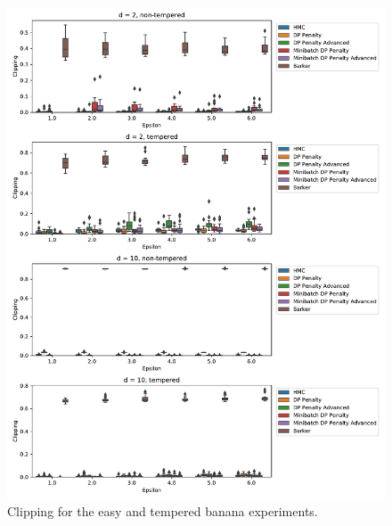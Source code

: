 \documentclass[english,twoside,openright]{HYgraduMLDS}
\begin{document}
\begin{figure}
  \centering
  \includegraphics[width=\textwidth]{figures/banana_clipping.pdf}
  \caption{
    Clipping for the easy and tempered banana experiments.
  }
  \label{banana_clipping_fig}
\end{figure}
\end{document}
